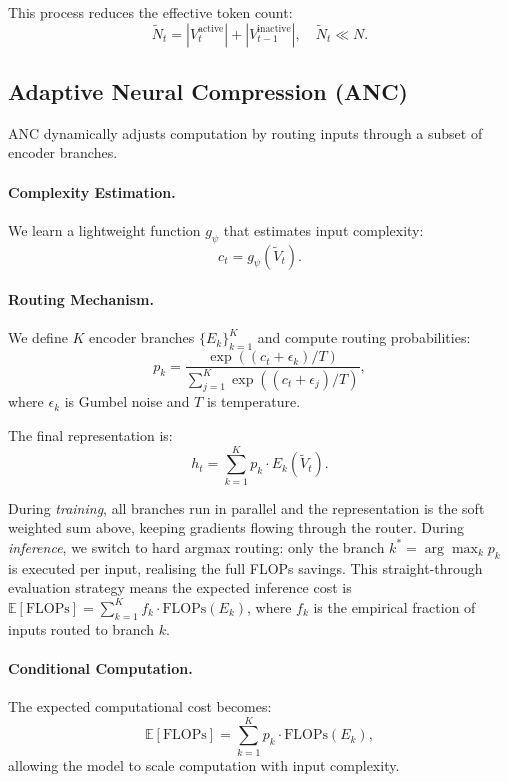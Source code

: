 \documentclass{article}
\begin{document}
This process reduces the effective token count:
\begin{equation}
\tilde{N}_t = |V_t^{\text{active}}| + |V_{t-1}^{\text{inactive}}|, \quad \tilde{N}_t \ll N.
\end{equation}

\subsection{Adaptive Neural Compression (ANC)}

ANC dynamically adjusts computation by routing inputs through a subset of encoder branches.

\paragraph{Complexity Estimation.}
We learn a lightweight function $g_\psi$ that estimates input complexity:
\begin{equation}
c_t = g_\psi(\tilde{V}_t).
\end{equation}

\paragraph{Routing Mechanism.}
We define $K$ encoder branches $\{E_k\}_{k=1}^{K}$ and compute routing probabilities:
\begin{equation}
p_k = \frac{\exp((c_t + \epsilon_k)/T)}{\sum_{j=1}^{K} \exp((c_t + \epsilon_j)/T)},
\end{equation}
where $\epsilon_k$ is Gumbel noise and $T$ is temperature.

The final representation is:
\begin{equation}
h_t = \sum_{k=1}^{K} p_k \cdot E_k(\tilde{V}_t).
\end{equation}

During \emph{training}, all branches run in parallel and the representation is the soft weighted sum above, keeping gradients flowing through the router. During \emph{inference}, we switch to hard argmax routing: only the branch $k^* = \arg\max_k p_k$ is executed per input, realising the full FLOPs savings. This straight-through evaluation strategy means the expected inference cost is $\mathbb{E}[\text{FLOPs}] = \sum_{k=1}^{K} f_k \cdot \text{FLOPs}(E_k)$, where $f_k$ is the empirical fraction of inputs routed to branch $k$.

\paragraph{Conditional Computation.}
The expected computational cost becomes:
\begin{equation}
\mathbb{E}[\text{FLOPs}] = \sum_{k=1}^{K} p_k \cdot \text{FLOPs}(E_k),
\end{equation}
allowing the model to scale computation with input complexity.
\end{document}
